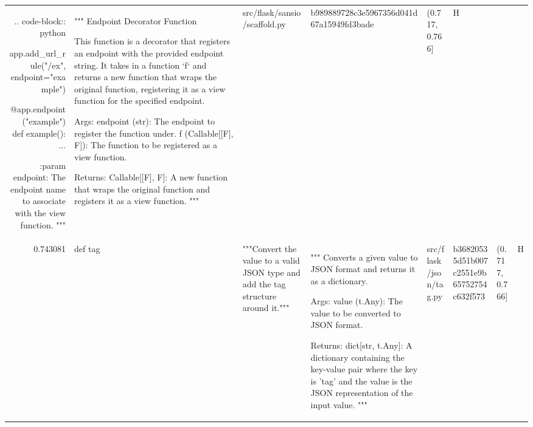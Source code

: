 \begin{tabular}{rlllllll}
        .. code-block:: python

            app.add_url_rule("/ex", endpoint="example")

            @app.endpoint("example")
            def example():
                ...

        :param endpoint: The endpoint name to associate with the view
            function.
        """ & """
Endpoint Decorator Function

This function is a decorator that registers an endpoint with the provided endpoint string.
It takes in a function `f` and returns a new function that wraps the original function, 
registering it as a view function for the specified endpoint.

Args:
    endpoint (str): The endpoint to register the function under.
    f (Callable[[F], F]): The function to be registered as a view function.

Returns:
    Callable[[F], F]: A new function that wraps the original function and registers it as a view function.
""" & src/flask/sansio/scaffold.py & b989889728c3e5967356d041d67a15949fd3bade & (0.717, 0.766] & H \\
0.743081 & def tag & """Convert the value to a valid JSON type and add the tag structure
        around it.""" & """
Converts a given value to JSON format and returns it as a dictionary.

Args:
    value (t.Any): The value to be converted to JSON format.

Returns:
    dict[str, t.Any]: A dictionary containing the key-value pair where the key is 'tag' and the value is the JSON representation of the input value.
""" & src/flask/json/tag.py & b36820535d51b007c2551e9b65752754c632f573 & (0.717, 0.766] & H \\
\bottomrule
\end{tabular}
